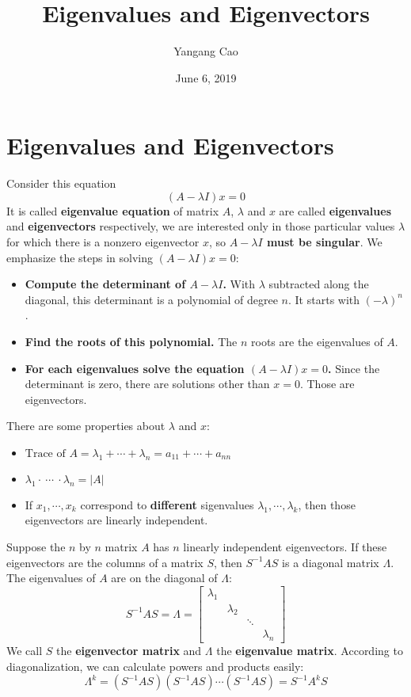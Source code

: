 \documentclass[10pt,a4paper,oneside]{article}
\author{Yangang Cao}
\date{June 6, 2019}
\begin{document}
\title{Eigenvalues and Eigenvectors}
\maketitle
\section{Eigenvalues and Eigenvectors}
Consider this equation
\[
(A-\lambda I)x=0
\]
It is called {\bfseries eigenvalue equation} of matrix $A$, $\lambda$ and $x$ are called {\bfseries eigenvalues} and {\bfseries eigenvectors} respectively, we are interested only in those particular values $\lambda$ for which there is a nonzero eigenvector $x$, so {\bfseries$A-\lambda I$ must be singular}. We emphasize the steps in solving $(A-\lambda I)x=0$:
\begin{itemize}
\item {\bfseries Compute the determinant of $A-\lambda I$.} With $\lambda$ subtracted along the diagonal, this determinant is a polynomial of degree $n$. It starts with $(-\lambda)^n$.
\item {\bfseries Find the roots of this polynomial.} The $n$ roots are the eigenvalues of $A$.
\item {\bfseries For each eigenvalues solve the equation $(A-\lambda I)x=0$.} Since the determinant is zero, there are solutions other than $x=0$. Those are eigenvectors.
\end{itemize}
There are some properties about $\lambda$ and $x$:
\begin{itemize}
\item$
\text{Trace of $A$} = \lambda_1+\cdots+\lambda_n=a_{11}+\cdots+a_{nn}
$
\item$
\lambda_1\cdot \  \cdots \ \cdot\lambda_n= |A|
$
\item If $x_1,\cdots,x_k$ correspond to {\bfseries different} sigenvalues $\lambda_{1},\cdots,\lambda_{k}$, then those eigenvectors are linearly independent.
\end{itemize}

Suppose the $n$ by $n$ matrix $A$ has $n$ linearly independent eigenvectors. If these eigenvectors are the columns of a matrix $S$, then $S^{-1}AS$ is a diagonal matrix $\Lambda$. The eigenvalues of $A$ are on the diagonal of $\Lambda$: 
\[
S^{-1} A S=\Lambda=\left[\begin{array}{cccc}{\lambda_{1}} & {} & { } & {} \\ { } & {\lambda_{2}} & {} & {} \\ {} & {} & {\ddots} & { } \\ { } & { } & { } & {\lambda_{n}}\end{array}\right]
\]
We call $S$ the {\bfseries eigenvector matrix} and $\Lambda$ the {\bfseries eigenvalue matrix}. According to diagonalization, we can calculate powers and products easily:
\[
\Lambda^k=(S^{-1}AS)(S^{-1}AS)\cdots(S^{-1}AS)=S^{-1}A^kS
\]
\end{document}
